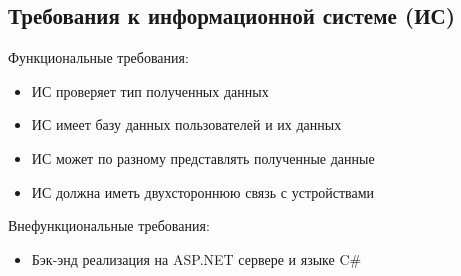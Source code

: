 \documentclass[12pt]{report}
\begin{document}
    \subsection{Требования к информационной системе (ИС)}
    Функциональные требования:
    \begin{itemize}
        \item ИС проверяет тип полученных данных
        \item ИС имеет базу данных пользователей и их данных
        \item ИС может по разному представлять полученные данные
        \item ИС должна иметь двухстороннюю связь с устройствами
    \end{itemize}
    Внефункциональные требования:
    \begin{itemize}
        \item Бэк-энд реализация на ASP.NET сервере и языке C\#
    \end{itemize}
\end{document}

